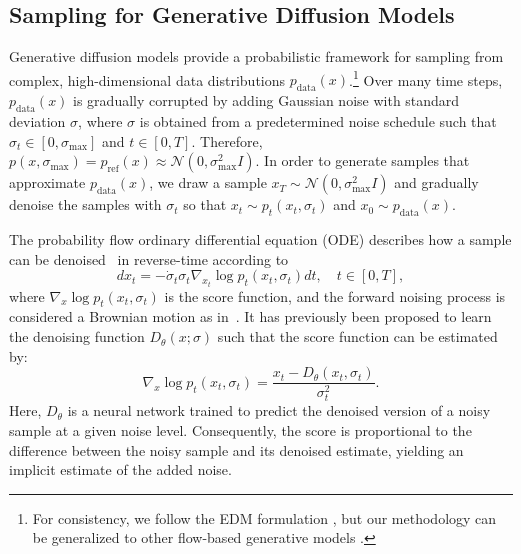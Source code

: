 \subsection{Sampling for Generative Diffusion Models}
Generative diffusion models \citep{sohl2015deep, song2021scorebasedgenerativemodelingstochastic, ho2020denoising, cao2024survey, karras2022elucidatingdesignspacediffusionbased} provide a probabilistic framework for sampling from complex, high-dimensional data distributions $p_{\text{data}}(x)$.\footnote{For consistency, we follow the EDM formulation \citep{karras2022elucidatingdesignspacediffusionbased}, but our methodology can be generalized to other flow-based generative models \citep{JMLR:v26:23-1605, lipman2023flow}.} Over many time steps, $p_{\text{data}}(x)$ is gradually corrupted by adding Gaussian noise with standard deviation $\sigma$, where $\sigma$ is obtained from a predetermined noise schedule such that $\sigma_t \in [0, \sigma_{\text{max}}]$ and $t \in [0, T]$. Therefore, $p(x , \sigma_{\text{max}}) = p_{\text{ref}}(x) \approx \mathcal{N}(0, \sigma_{\text{max}}^2 I)$. In order to generate samples that approximate $p_{\text{data}}(x)$, we draw a sample $x_T \sim \mathcal{N}(0, \sigma_{\text{max}}^2 I)$ and gradually denoise the samples with $\sigma_t$ so that $x_t \sim p_t(x_t , \sigma_t)$ and $x_0 \sim p_{\text{data}}(x)$. 

The probability flow ordinary differential equation (ODE) describes how a sample can be denoised~\citep{song2021scorebasedgenerativemodelingstochastic, karras2022elucidatingdesignspacediffusionbased} in reverse-time according to
\begin{equation}
    d x_t = -\Dot{\sigma}_t \sigma_t \nabla_{x_t} \log p_t(x_t, \sigma_t)dt, \quad t\in[0, T], 
    \label{eq:prob_ODE_noise}
\end{equation}
%
where $\nabla_x \log p_t(x_t, \sigma_t)$ is the score function, and the forward noising process is considered a Brownian motion as in~\citet{karras2022elucidatingdesignspacediffusionbased}. It has previously been proposed \citep{karras2022elucidatingdesignspacediffusionbased} to learn the denoising function $D_{\theta}(x; \sigma)$ such that the score function can be estimated by: 
\begin{equation}
    \nabla_{x} \log p_t(x_t, \sigma_t) = \frac{x_t - D_\theta(x_t,\sigma_t)}{\sigma_t^2}. 
\end{equation}
%
Here, $D_{\theta}$ is a neural network trained to predict the denoised version of a noisy sample at a given noise level. Consequently, the score is proportional to the difference between the noisy sample and its denoised estimate, yielding an implicit estimate of the added noise. 
 
